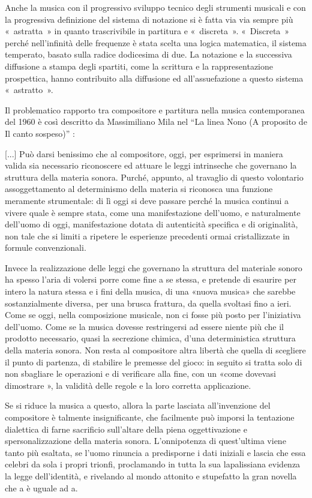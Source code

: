 \begin{itemize}
Anche la musica con il progressivo sviluppo tecnico degli strumenti musicali e
con la progressiva definizione  del sistema di notazione si è fatta via via
sempre più « astratta » in quanto trascrivibile in partitura  e « discreta ».
« Discreta » perché nell’infinità delle frequenze è stata scelta una logica
matematica, il sistema temperato, basato sulla   radice dodicesima di due.  La
notazione e la successiva diffusione a stampa degli spartiti, come la scrittura
e la rappresentazione prospettica, hanno  contribuito alla diffusione ed
all’assuefazione  a questo sistema « astratto ».

Il problematico rapporto  tra compositore e partitura nella musica contemporanea
del 1960 è così descritto da Massimiliano Mila nel “La linea Nono (A proposito
de Il canto sospeso)” :

[...] Può darsi benissimo che al compositore, oggi, per esprimersi in maniera
valida sia necessario riconoscere ed attuare le leggi intrinseche che governano
la struttura della materia sonora. Purché, appunto, al travaglio di questo
volontario assoggettamento al determinismo della materia si riconosca una
funzione meramente strumentale: di lì oggi si deve passare perché la musica
continui a vivere quale è sempre stata, come una manifestazione dell’uomo, e
naturalmente dell’uomo di oggi, manifestazione dotata di autenticità specifica e
di originalità, non tale che si limiti a ripetere le esperienze precedenti
ormai cristallizzate in formule convenzionali.

Invece la realizzazione delle leggi che governano la struttura del materiale
sonoro ha spesso l’aria di volersi porre come fine a se stessa, e pretende di
esaurire per intero la natura stessa e i fini della musica, di una «nuova musica»
che sarebbe sostanzialmente diversa, per una brusca frattura, da quella svoltasi
fino a ieri. Come se oggi, nella composizione musicale, non ci fosse più posto
per l’iniziativa dell’uomo. Come se la musica dovesse restringersi ad essere
niente più che il prodotto necessario, quasi la secrezione chimica, d’una
deterministica struttura della materia sonora. Non resta al compositore altra
libertà che quella di scegliere il punto di partenza, di stabilire le premesse
del gioco: in seguito si tratta solo di non sbagliare le operazioni e di
verificare alla fine, con un «come dovevasi dimostrare », la validità delle
regole e la loro corretta applicazione.

Se si riduce la musica a questo, allora la parte lasciata all’invenzione del
compositore è talmente insignificante, che facilmente può imporsi la tentazione
dialettica di farne sacrificio sull’altare della piena oggettivazione e
spersonalizzazione della materia sonora. L’onnipotenza di quest’ultima viene
tanto più esaltata, se l’uomo rinuncia a predisporne i dati iniziali e lascia
che essa celebri da sola i propri trionfi, proclamando in tutta la sua
lapalissiana evidenza la legge dell’identità, e rivelando al mondo attonito e
stupefatto la gran novella che a è uguale ad a.


\end{itemize}
